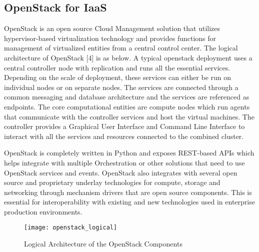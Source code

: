 \subsection{OpenStack for IaaS}

OpenStack is an open source Cloud Management solution that utilizes hypervisor-based virtualization technology and provides functions for management of virtualized entities from a central control center. The logical architecture of OpenStack [4] is as below. A typical openstack deployment uses a central controller node with replication and runs all the essential services. Depending on the scale of deployment, these services can either be run on individual nodes or on separate nodes. The services are connected through a common messaging and database architecture and the services are referenced as endpoints. The core computational entities are compute nodes which run agents that communicate with the controller services and host the virtual machines. The controller provides a Graphical User Interface and Command Line Interface to interact with all the services and resources connected to the combined cluster. 

OpenStack is completely written in Python and exposes REST-based APIs which helps integrate with multiple Orchestration or other solutions that need to use OpenStack services and events. OpenStack also integrates with several open source and proprietary underlay technologies for compute, storage and networking through mechanism drivers that are open source components. This is essential for interoperability with existing and new technologies used in enterprise production environments.

\begin{figure}
    \centering
    \texttt{[image: openstack\_logical]}
    \label{fig:figure12}
    \caption{Logical Architecture of the OpenStack Components}
\end{figure}

